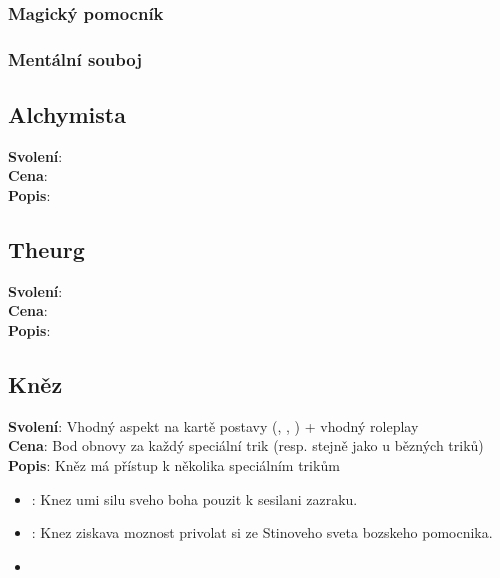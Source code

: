 \documentclass[../main.tex]{subfiles}
\begin{document}
\subsubsection*{Magický pomocník}
\label{sec:magickypomocnik}

\subsubsection*{Mentální souboj}
\label{sec:mentalnisouboj}


\begin{Povolani}
\subsection{Alchymista}
\label{sec:pov-alchymista}
\textbf{Svolení}:\\
\textbf{Cena}:\\
\textbf{Popis}:\\

\end{Povolani}

\begin{Povolani}
\subsection{Theurg}
\label{sec:pov-theurg}
\textbf{Svolení}:\\
\textbf{Cena}:\\
\textbf{Popis}:\\

\end{Povolani}

\begin{Povolani}  
\subsection{Kněz}
\label{sec:pov-knez}
\textbf{Svolení}: Vhodný aspekt na kartě postavy (, , ) + vhodný roleplay \\
\textbf{Cena}: Bod obnovy za každý speciální trik (resp. stejně jako u bězných triků) \\
\textbf{Popis}: Kněz má přístup k několika speciálním trikům \\
\begin{itemize}
	\item {}: Knez umi silu sveho boha pouzit k sesilani zazraku. 
	\item {}: Knez ziskava moznost privolat si ze Stinoveho sveta bozskeho pomocnika.
	\item {}
\end{itemize}
\end{Povolani}
\end{document}
